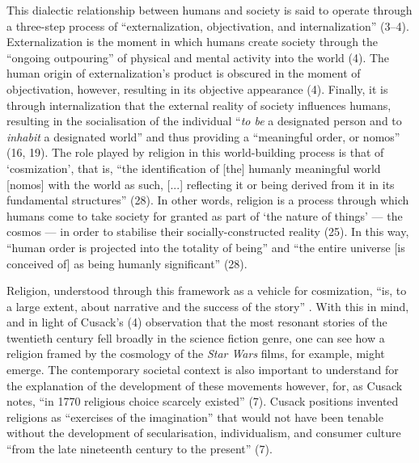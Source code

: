 \documentclass[Draft.tex]{subfiles}
\begin{document}
This dialectic relationship between humans and society is said to operate
through a three-step process of
``externalization, objectivation, and internalization'' (3--4).
Externalization is the moment in which humans create society
through the ``ongoing outpouring'' of physical and mental activity
into the world (4).
The human origin of externalization's product is obscured
in the moment of objectivation, however,
resulting in its objective appearance (4).
Finally, it is through internalization that the external
reality of society influences humans, resulting in
the socialisation of the individual
``\textit{to be} a designated person
and to \textit{inhabit} a designated world''
and thus providing a ``meaningful order, or nomos'' (16, 19).
The role played by religion in this world-building process
is that of `cosmization', that is,
``the identification of [the] humanly meaningful world [nomos]
with the world as such, [...] reflecting it or being derived from it
in its fundamental structures'' (28).
In other words, religion is a process through which humans
come to take society for granted as part of `the nature of things'
--- the cosmos --- in order to stabilise their socially-constructed reality (25).
In this way, ``human order is projected into the totality of being''
and ``the entire universe [is conceived of] as being humanly significant'' (28).

Religion, understood through this framework as a vehicle for cosmization,
``is, to a large extent, about narrative
and the success of the story'' \parencite[4]{Cusack10}.
With this in mind, and in light of Cusack's (4) observation
that the most resonant stories of the twentieth century
fell broadly in the science fiction genre,
one can see how a religion framed by the cosmology of
the \textit{Star Wars} films, for example, might emerge.
The contemporary societal context is also important to understand
for the explanation of the development of these movements however,
for, as Cusack notes, ``in 1770 religious choice scarcely existed'' (7).
Cusack positions invented religions as ``exercises of the imagination''
that would not have been tenable without the development of
secularisation, individualism, and consumer culture
``from the late nineteenth century to the present'' (7).
\end{document}
